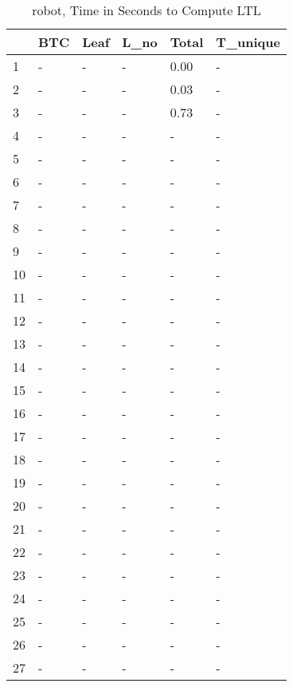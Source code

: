 \begin{table}
\centering
\caption{robot, Time in Seconds to Compute LTL}
\label{robot_LTL_time}
\begin{tabular}{llllll}
\toprule
{} & BTC & Leaf & L\_no & Total & T\_unique \\
\midrule
1  &   - &    - &    - &  0.00 &        - \\
2  &   - &    - &    - &  0.03 &        - \\
3  &   - &    - &    - &  0.73 &        - \\
4  &   - &    - &    - &     - &        - \\
5  &   - &    - &    - &     - &        - \\
6  &   - &    - &    - &     - &        - \\
7  &   - &    - &    - &     - &        - \\
8  &   - &    - &    - &     - &        - \\
9  &   - &    - &    - &     - &        - \\
10 &   - &    - &    - &     - &        - \\
11 &   - &    - &    - &     - &        - \\
12 &   - &    - &    - &     - &        - \\
13 &   - &    - &    - &     - &        - \\
14 &   - &    - &    - &     - &        - \\
15 &   - &    - &    - &     - &        - \\
16 &   - &    - &    - &     - &        - \\
17 &   - &    - &    - &     - &        - \\
18 &   - &    - &    - &     - &        - \\
19 &   - &    - &    - &     - &        - \\
20 &   - &    - &    - &     - &        - \\
21 &   - &    - &    - &     - &        - \\
22 &   - &    - &    - &     - &        - \\
23 &   - &    - &    - &     - &        - \\
24 &   - &    - &    - &     - &        - \\
25 &   - &    - &    - &     - &        - \\
26 &   - &    - &    - &     - &        - \\
27 &   - &    - &    - &     - &        - \\

\end{tabular}
\end{table}
